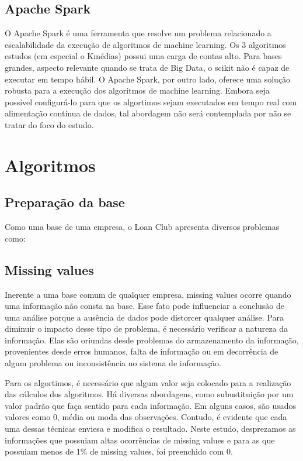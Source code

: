 \subsection{Apache Spark}

O Apache Spark é uma ferramenta que resolve um problema relacionado a escalabilidade da execução de algoritmos de machine learning. Os 3 algoritmos estudos (em especial o Kmédias) possui uma carga de contas alto. Para bases grandes, aspecto relevante quando se trata de Big Data, o scikit não é capaz de executar em tempo hábil. O Apache Spark, por outro lado, oferece uma solução robusta para a execução dos algoritmos de machine learning. Embora seja possível configurá-lo para que os algortimos sejam executados em tempo real com alimentação contínua de dados, tal abordagem não será contemplada por não se tratar do foco do estudo.

\section{Algoritmos}

\subsection{Preparação da base}

Como uma base de uma empresa, o Loan Club apresenta diversos problemas como:

\subsection{Missing values}
Inerente a uma base comum de qualquer empresa, missing values ocorre quando uma informação não consta na base. Esse fato pode influenciar a conclusão de uma análise porque a ausência de dados pode distorcer qualquer análise. Para diminuir o impacto desse tipo de problema, é necessário verificar a natureza da informação. Elas são oriundas desde problemas do armazenamento da informação, provenientes desde erros humanos, falta de informação ou em decorrência de algum problema ou inconsistência no sistema de informação.

Para os algortimos, é necessário que algum valor seja colocado para a realização das cálculos dos algoritmos. Há diversas abordagens, como subustituição por um valor padrão que faça sentido para cada informação. Em alguns casos, são usados valores como 0, média ou moda das observações. Contudo, é evidente que cada uma dessas técnicas enviesa e modifica o resultado. Neste estudo, desprezamos as informações que possuiam altas ocorrências de missing values e para as que possuiam menos de 1\% de missing values, foi preenchido com 0.

